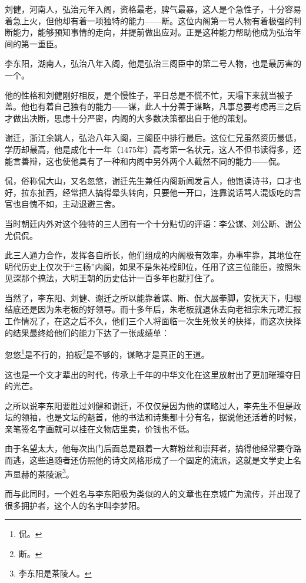 \begin{multicols}{\theparacolNo}
		刘健，河南人，弘治元年入阁，资格最老，脾气最暴，这人是个急性子，十分容易着急上火，但他却有着一项独特的能力——断。这位内阁第一号人物有着极强的判断能力，能够预知事情的走向，并提前做出应对。正是这种能力帮助他成为弘治年间的第一重臣。

		李东阳，湖南人，弘治八年入阁，他是弘治三阁臣中的第二号人物，也是最厉害的一个。

		他的性格和刘健刚好相反，是个慢性子，平日总是不慌不忙，天塌下来就当被子盖。他也有着自己独有的能力——谋，此人十分善于谋略，凡事总要考虑再三之后才做出决断，思虑十分严密，内阁的大多数决策都出自于他的策划。

		谢迁，浙江余姚人，弘治八年入阁，三阁臣中排行最后。这位仁兄虽然资历最低，学历却最高，他是成化十一年（1475年）高考第一名状元，这人不但书读得多，还能言善辩，这也使他具有了一种和内阁中另外两个人截然不同的能力——侃。

		侃，俗称侃大山，又名忽悠，谢迁先生兼任内阁新闻发言人，他饱读诗书，口才也好，拉东扯西，经常把人搞得晕头转向，只要他一开口，连靠说话骂人混饭吃的言官也自愧不如，主动退避三舍。

		当时朝廷内外对这个独特的三人团有一个十分贴切的评语：李公谋、刘公断、谢公尤侃侃。

		此三人通力合作，发挥各自所长，他们组成的内阁极有效率，办事牢靠，其地位在明代历史上仅次于“三杨”内阁，如果不是朱祐樘即位，任用了这三位能臣，按照朱见深那个搞法，大明王朝的历史估计一百多年也就打住了。

		当然了，李东阳、刘健、谢迁之所以能靠着谋、断、侃大展拳脚，安抚天下，归根结底还是因为朱老板的好领导。而十多年后，朱老板就退休去向老祖宗朱元璋汇报工作情况了，在这之后不久，他们三个人将面临一次生死攸关的抉择，而这次抉择的结果最终给他们的能力下达了一张成绩单：

		忽悠\footnote{侃。}是不行的，拍板\footnote{断。}是不够的，谋略才是真正的王道。

		这也是一个文才辈出的时代，传承上千年的中华文化在这里放射出了更加璀璨夺目的光芒。

		之所以说李东阳要胜过刘健和谢迁，不仅仅是因为他的谋略过人，李先生不但是政坛的领袖，也是文坛的魁首，他的书法和诗集都十分有名，据说他还活着的时候，亲笔签名字画就可以挂在文物店里卖，价钱也不低。

		由于名望太大，他每次出门后面总是跟着一大群粉丝和崇拜者，搞得他经常要夺路而逃，这些追随者还仿照他的诗文风格形成了一个固定的流派，这就是文学史上名声显赫的茶陵派\footnote{李东阳是茶陵人。}。

		而与此同时，一个姓名与李东阳极为类似的人的文章也在京城广为流传，并出现了很多拥护者，这个人的名字叫李梦阳。


\end{multicols}
